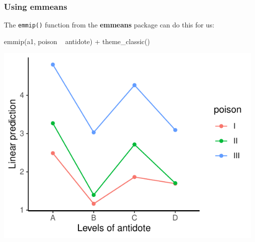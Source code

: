 \documentclass[a4paper]{article}\usepackage[]{graphicx}\usepackage[]{xcolor}
\makeatletter
\def\maxwidth{ %
  \ifdim\Gin@nat@width>\linewidth
    \linewidth
  \else
    \Gin@nat@width
  \fi
}
\makeatother
\begin{document}
\subsubsection{Using emmeans}
The \lstinline|emmip()| function from the \textbf{emmeans} package can do this for us:\\
\begin{minipage}[t]{0.49\textwidth}
\begin{Schunk}
\begin{Sinput}
emmip(a1, poison ~ antidote) +
  theme_classic()
\end{Sinput}


{\centering \includegraphics[width=\maxwidth]{figure/listings-unnamed-chunk-318-1} 

}

\end{Schunk}
\end{minipage}
\hspace{0.02\textwidth}
\end{document}
